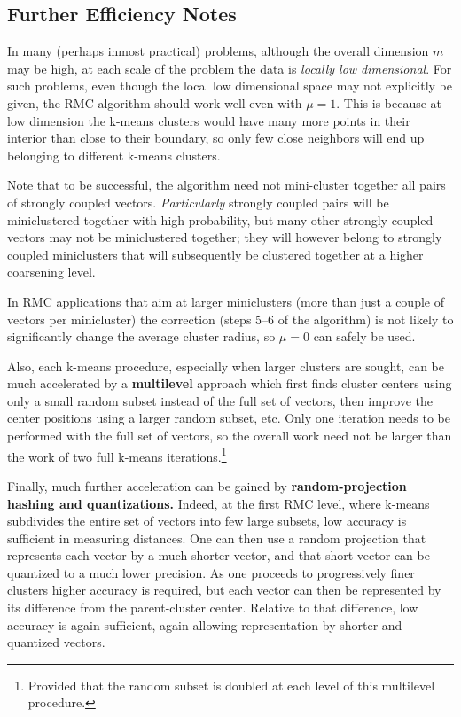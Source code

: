 \documentclass{article} %
\begin{document}
\subsection{Further Efficiency Notes}
\label{sec:G.3}
In many (perhaps inmost practical) problems, although the overall dimension $m$ may be high, at each scale of the problem the data is {\it locally low dimensional}. For such problems, even though the local low dimensional space may not explicitly be given, the RMC algorithm should work well even with $\mu = 1$. This is because at low dimension the k-means clusters would have many more points in their interior than close to their boundary, so only few close neighbors will end up belonging to different k-means clusters.

Note that to be successful, the algorithm need not mini-cluster together all pairs of strongly coupled vectors. {\it Particularly} strongly coupled pairs will be miniclustered together with high probability, but many other strongly coupled vectors may not be miniclustered together; they will however belong to strongly coupled miniclusters that will subsequently be clustered together at a higher coarsening level.

In RMC applications that aim at larger miniclusters (more than just a couple of vectors per minicluster) the correction (steps 5--6 of the algorithm) is not likely to significantly change the average cluster radius, so $\mu=0$ can safely be used.

Also, each k-means procedure, especially when larger clusters are sought, can be much accelerated by a {\bf multilevel} approach which first finds cluster centers using only a small random subset instead of the full set of vectors, then improve the center positions using a larger random subset, etc. Only one iteration needs to be performed with the full set of vectors, so the overall work need not be larger than the work of two full k-means iterations.\footnote{Provided that the random subset is doubled at each level of this multilevel procedure.}

Finally, much further acceleration can be gained by {\bf random-projection hashing and quantizations.} Indeed, at the first RMC level, where k-means subdivides the entire set of vectors into few large subsets, low accuracy is sufficient in measuring distances. One can then use a random projection that represents each vector by a much shorter vector, and that short vector can be quantized to a much lower precision. As one proceeds to progressively finer clusters higher accuracy is required, but each vector can then be represented by its difference from the parent-cluster center. Relative to that difference, low accuracy is again sufficient, again allowing representation by shorter and quantized vectors.
\end{document}
